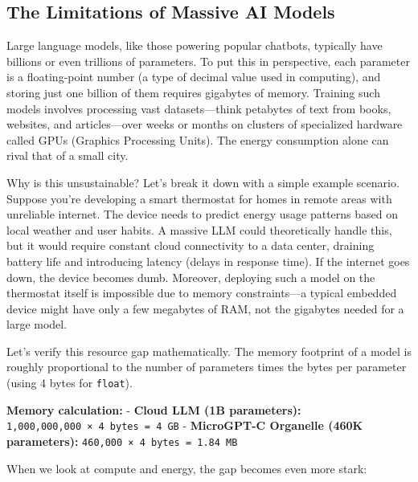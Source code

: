 \documentclass[
]{article}
\begin{document}
\subsection{The Limitations of Massive AI
Models}\label{the-limitations-of-massive-ai-models}

Large language models, like those powering popular chatbots, typically
have billions or even trillions of parameters. To put this in
perspective, each parameter is a floating-point number (a type of
decimal value used in computing), and storing just one billion of them
requires gigabytes of memory. Training such models involves processing
vast datasets---think petabytes of text from books, websites, and
articles---over weeks or months on clusters of specialized hardware
called GPUs (Graphics Processing Units). The energy consumption alone
can rival that of a small city.

Why is this unsustainable? Let's break it down with a simple example
scenario. Suppose you're developing a smart thermostat for homes in
remote areas with unreliable internet. The device needs to predict
energy usage patterns based on local weather and user habits. A massive
LLM could theoretically handle this, but it would require constant cloud
connectivity to a data center, draining battery life and introducing
latency (delays in response time). If the internet goes down, the device
becomes dumb. Moreover, deploying such a model on the thermostat itself
is impossible due to memory constraints---a typical embedded device
might have only a few megabytes of RAM, not the gigabytes needed for a
large model.

Let's verify this resource gap mathematically. The memory footprint of a
model is roughly proportional to the number of parameters times the
bytes per parameter (using 4 bytes for \texttt{float}).

\textbf{Memory calculation:} - \textbf{Cloud LLM (1B parameters):}
\texttt{1,000,000,000\ ×\ 4\ bytes\ =\ 4\ GB} - \textbf{MicroGPT-C
Organelle (460K parameters):} \texttt{460,000\ ×\ 4\ bytes\ =\ 1.84\ MB}

When we look at compute and energy, the gap becomes even more stark:
\end{document}
